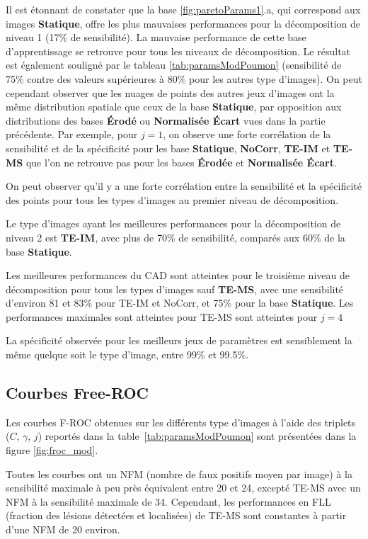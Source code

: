 Il est étonnant de constater que la base \ref{fig:paretoParams1}.a, qui correspond aux images \textbf{Statique}, offre les plus mauvaises performances pour la décomposition de niveau 1 (17\% de sensibilité). La mauvaise performance de cette base d'apprentissage se retrouve pour tous les niveaux de décomposition. Le résultat est également souligné par le tableau \ref{tab:paramsModPoumon} (sensibilité de 75\% contre des valeurs supérieures à 80\% pour les autres type d'images). On peut cependant observer que les nuages de points des autres jeux d'images ont la même distribution spatiale que ceux de la base \textbf{Statique}, par opposition aux distributions des bases \textbf{Érodé} ou \textbf{Normalisée Écart} vues dans la partie précédente. Par exemple, pour $j=1$, on observe une forte corrélation de la sensibilité et de la spécificité pour les base \textbf{Statique}, \textbf{NoCorr}, \textbf{TE-IM} et \textbf{TE-MS} que l'on ne retrouve pas pour les bases \textbf{Érodée} et \textbf{Normalisée Écart}. 

On peut observer qu'il y a une forte corrélation entre la sensibilité et la spécificité des points pour tous les types d'images au premier niveau de décomposition.

Le type d'images ayant les meilleures performances pour la décomposition de niveau 2 est \textbf{TE-IM}, avec plus de 70\% de sensibilité, comparés aux 60\% de la base \textbf{Statique}. 

Les meilleures performances du CAD sont atteintes pour le troisième niveau de décomposition pour tous les types d'images sauf \textbf{TE-MS}, avec une sensibilité d'environ 81 et 83\% pour TE-IM et NoCorr, et 75\% pour la base \textbf{Statique}. Les performances maximales sont atteintes pour TE-MS sont atteintes pour $j=4$

La spécificité observée pour les meilleurs jeux de paramètres est sensiblement la même quelque soit le type d'image, entre 99\% et 99.5\%.

\subsection{Courbes Free-ROC}

Les courbes F-ROC obtenues sur les différents type d'images à l'aide des triplets ($C$, $\gamma$, $j$) reportés dans la table~\ref{tab:paramsModPoumon} sont présentées dans la figure \ref{fig:froc_mod}. 

Toutes les courbes ont un NFM (nombre de faux positifs moyen par image) à la sensibilité maximale à peu près équivalent entre 20 et 24, excepté TE-MS avec un NFM à la sensibilité maximale de 34. Cependant, les performances en FLL (fraction  des lésions détectées et localisées) de TE-MS sont constantes à partir d'une NFM de 20 environ. 

